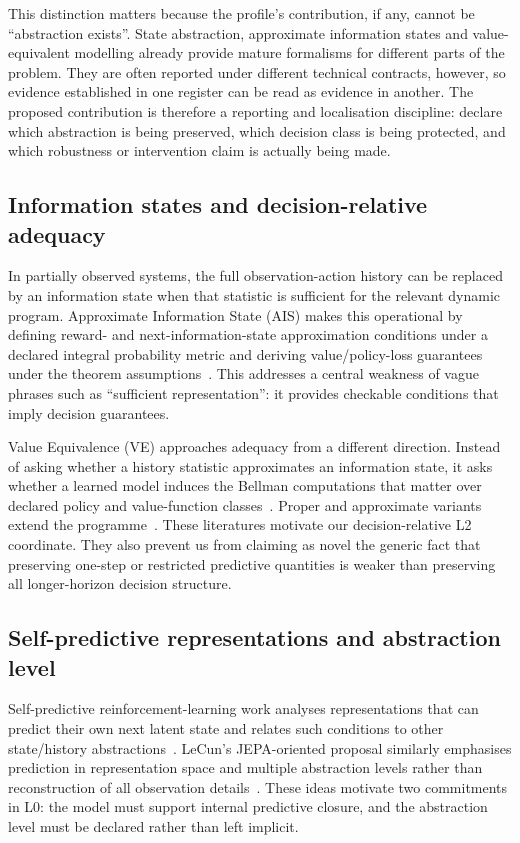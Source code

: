 \documentclass[10pt]{article}
\begin{document}
This distinction matters because the profile's contribution, if any, cannot be ``abstraction exists''. State abstraction, approximate information states and value-equivalent modelling already provide mature formalisms for different parts of the problem. They are often reported under different technical contracts, however, so evidence established in one register can be read as evidence in another. The proposed contribution is therefore a reporting and localisation discipline: declare which abstraction is being preserved, which decision class is being protected, and which robustness or intervention claim is actually being made.

\subsection{Information states and decision-relative adequacy}

In partially observed systems, the full observation-action history can be replaced by an information state when that statistic is sufficient for the relevant dynamic program. Approximate Information State (AIS) makes this operational by defining reward- and next-information-state approximation conditions under a declared integral probability metric and deriving value/policy-loss guarantees under the theorem assumptions~\cite{subramanian2022}. This addresses a central weakness of vague phrases such as ``sufficient representation'': it provides checkable conditions that imply decision guarantees.

Value Equivalence (VE) approaches adequacy from a different direction. Instead of asking whether a history statistic approximates an information state, it asks whether a learned model induces the Bellman computations that matter over declared policy and value-function classes~\cite{grimm2020}. Proper and approximate variants extend the programme~\cite{grimm2021,grimm2022}. These literatures motivate our decision-relative L2 coordinate. They also prevent us from claiming as novel the generic fact that preserving one-step or restricted predictive quantities is weaker than preserving all longer-horizon decision structure.

\subsection{Self-predictive representations and abstraction level}

Self-predictive reinforcement-learning work analyses representations that can predict their own next latent state and relates such conditions to other state/history abstractions~\cite{ni2024}. LeCun's JEPA-oriented proposal similarly emphasises prediction in representation space and multiple abstraction levels rather than reconstruction of all observation details~\cite{lecun2022}. These ideas motivate two commitments in L0: the model must support internal predictive closure, and the abstraction level must be declared rather than left implicit.
\end{document}
